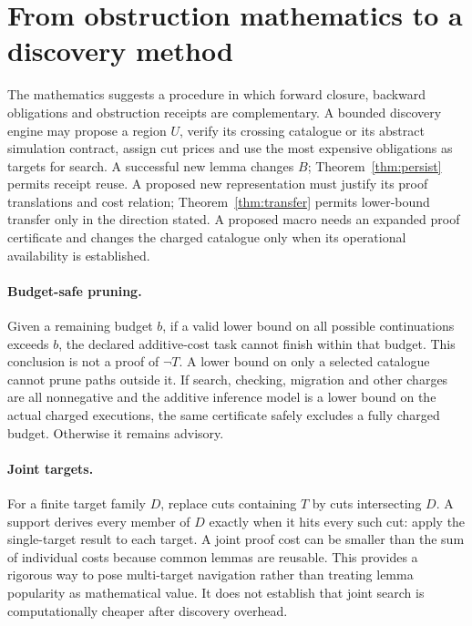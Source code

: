 \documentclass[11pt]{article}
\theoremstyle{remark}\newtheorem{remark}[theorem]{Remark}
\begin{document}
\section{From obstruction mathematics to a discovery method}
The mathematics suggests a procedure in which forward closure, backward obligations and obstruction receipts are complementary. A bounded discovery engine may propose a region $U$, verify its crossing catalogue or its abstract simulation contract, assign cut prices and use the most expensive obligations as targets for search. A successful new lemma changes $B$; Theorem~\ref{thm:persist} permits receipt reuse. A proposed new representation must justify its proof translations and cost relation; Theorem~\ref{thm:transfer} permits lower-bound transfer only in the direction stated. A proposed macro needs an expanded proof certificate and changes the charged catalogue only when its operational availability is established.

\paragraph{Budget-safe pruning.} Given a remaining budget $b$, if a valid lower bound on all possible continuations exceeds $b$, the declared additive-cost task cannot finish within that budget. This conclusion is not a proof of $\neg T$. A lower bound on only a selected catalogue cannot prune paths outside it. If search, checking, migration and other charges are all nonnegative and the additive inference model is a lower bound on the actual charged executions, the same certificate safely excludes a fully charged budget. Otherwise it remains advisory.

\paragraph{Joint targets.} For a finite target family $D$, replace cuts containing $T$ by cuts intersecting $D$. A support derives every member of $D$ exactly when it hits every such cut: apply the single-target result to each target. A joint proof cost can be smaller than the sum of individual costs because common lemmas are reusable. This provides a rigorous way to pose multi-target navigation rather than treating lemma popularity as mathematical value. It does not establish that joint search is computationally cheaper after discovery overhead.
\end{document}
